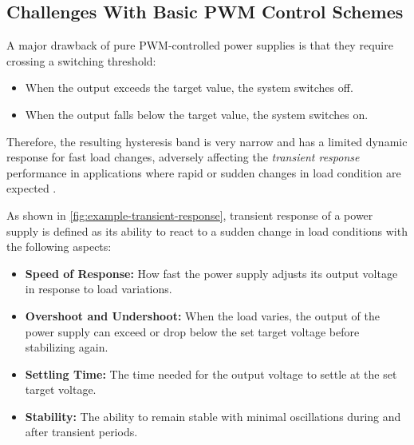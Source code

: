 \subsection{Challenges With Basic \acs{PWM} Control Schemes}
\label{subsec:challenges-withbasic-pwm-control-schemes}

A major drawback of pure \ac{PWM}-controlled power supplies is that they require
crossing a switching threshold:

\begin{itemize}[topsep=8pt,itemsep=4pt,partopsep=4pt, parsep=4pt]
    \item
    When the output exceeds the target value, the system switches off.

    \item
    When the output falls below the target value, the system switches on.
\end{itemize}

Therefore, the resulting hysteresis band is very narrow and has a limited
dynamic response for fast load changes, adversely affecting the
\emph{transient response} performance in applications where rapid or sudden
changes in load condition are expected
\autocite{paper:fangrui,paper:ngai-man}.

As shown in \autoref{fig:example-transient-response}, transient response of
a power supply is defined as its ability to react to a sudden change in load
conditions with the following aspects:

\begin{itemize}[topsep=8pt,itemsep=4pt,partopsep=4pt, parsep=4pt]
    \item \textbf{Speed of Response:}
    How fast the power supply adjusts its output voltage in response to
    load variations.

    \item \textbf{Overshoot and Undershoot:}
    When the load varies, the output of the power supply can exceed or
    drop below the set target voltage before stabilizing again.

    \item \textbf{Settling Time:}
    The time needed for the output voltage to settle at the set target
    voltage.

    \item \textbf{Stability:}
    The ability to remain stable with minimal oscillations during and after
    transient periods.

\end{itemize}

